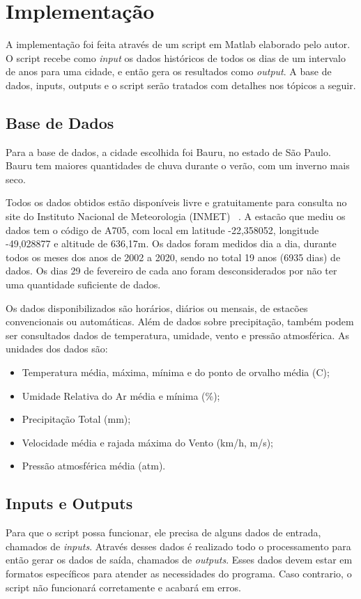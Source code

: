 \chapter{Implementação}
\label{c.implementacao}
A implementação foi feita através de um script em Matlab elaborado pelo autor. O script recebe como \emph{input} os dados históricos de todos os dias de um intervalo de anos para uma cidade, e então gera os resultados como \emph{\emph{output}}. A base de dados, inputs, outputs e o script serão tratados com detalhes nos tópicos a seguir.

\section{Base de Dados}
\label{s.basedados}
Para a base de dados, a cidade escolhida foi Bauru, no estado de São Paulo. Bauru tem maiores quantidades de chuva durante o verão, com um inverno mais seco.

Todos os dados obtidos estão disponíveis livre e gratuitamente para consulta no site do Instituto Nacional de Meteorologia (INMET) ~\cite{inmet}. A estacão que mediu os dados tem o código de A705, com local em latitude -22,358052, longitude -49,028877 e altitude de 636,17m. Os dados foram medidos dia a dia, durante todos os meses dos anos de 2002 a 2020, sendo no total 19 anos (6935 dias) de dados. Os dias 29 de fevereiro de cada ano foram desconsiderados por não ter uma quantidade suficiente de dados. 

Os dados disponibilizados são horários, diários ou mensais, de estacões convencionais ou automáticas. Além de dados sobre precipitação, também podem ser consultados dados de temperatura, umidade, vento e pressão atmosférica. As unidades dos dados são:
\begin{itemize}
    \item Temperatura média, máxima, mínima e do ponto de orvalho média (\degree C);
    \item Umidade Relativa do Ar média e mínima (\%);
    \item Precipitação Total (mm);
    \item Velocidade média e rajada máxima do Vento (km/h, m/s);
    \item Pressão atmosférica média (atm).
\end{itemize}



\section{Inputs e Outputs}
\label{s.io}
Para que o script possa funcionar, ele precisa de alguns dados de entrada, chamados de \emph{inputs}. Através desses dados é realizado todo o processamento para então gerar os dados de saída, chamados de \emph{outputs}.
Esses dados devem estar em formatos específicos para atender as necessidades do programa. Caso contrario, o script não funcionará corretamente e acabará em erros.

